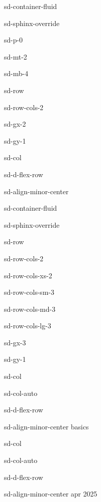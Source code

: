 \documentclass[letterpaper,10pt,italian]{jupyterBook}
\begin{document}
\begin{sphinxuseclass}{sd-container-fluid}
\begin{sphinxuseclass}{sd-sphinx-override}
\begin{sphinxuseclass}{sd-p-0}
\begin{sphinxuseclass}{sd-mt-2}
\begin{sphinxuseclass}{sd-mb-4}
\begin{sphinxuseclass}{sd-row}
\begin{sphinxuseclass}{sd-row-cols-2}
\begin{sphinxuseclass}{sd-gx-2}
\begin{sphinxuseclass}{sd-gy-1}
\begin{sphinxuseclass}{sd-col}
\begin{sphinxuseclass}{sd-d-flex-row}
\begin{sphinxuseclass}{sd-align-minor-center}
\begin{sphinxuseclass}{sd-container-fluid}
\begin{sphinxuseclass}{sd-sphinx-override}
\begin{sphinxuseclass}{sd-row}
\begin{sphinxuseclass}{sd-row-cols-2}
\begin{sphinxuseclass}{sd-row-cols-xs-2}
\begin{sphinxuseclass}{sd-row-cols-sm-3}
\begin{sphinxuseclass}{sd-row-cols-md-3}
\begin{sphinxuseclass}{sd-row-cols-lg-3}
\begin{sphinxuseclass}{sd-gx-3}
\begin{sphinxuseclass}{sd-gy-1}
\begin{sphinxuseclass}{sd-col}
\begin{sphinxuseclass}{sd-col-auto}
\begin{sphinxuseclass}{sd-d-flex-row}
\begin{sphinxuseclass}{sd-align-minor-center}
\sphinxAtStartPar
basics

\end{sphinxuseclass}
\end{sphinxuseclass}
\end{sphinxuseclass}
\end{sphinxuseclass}
\begin{sphinxuseclass}{sd-col}
\begin{sphinxuseclass}{sd-col-auto}
\begin{sphinxuseclass}{sd-d-flex-row}
\begin{sphinxuseclass}{sd-align-minor-center}
 apr 2025


\end{sphinxuseclass}
\end{sphinxuseclass}
\end{sphinxuseclass}
\end{sphinxuseclass}
\end{sphinxuseclass}
\end{sphinxuseclass}
\end{sphinxuseclass}
\end{sphinxuseclass}
\end{sphinxuseclass}
\end{sphinxuseclass}
\end{sphinxuseclass}
\end{sphinxuseclass}
\end{sphinxuseclass}
\end{sphinxuseclass}
\end{sphinxuseclass}
\end{sphinxuseclass}
\end{sphinxuseclass}
\end{sphinxuseclass}
\end{sphinxuseclass}
\end{sphinxuseclass}
\end{sphinxuseclass}
\end{sphinxuseclass}
\end{sphinxuseclass}
\end{sphinxuseclass}
\end{sphinxuseclass}
\end{sphinxuseclass}
\end{document}
